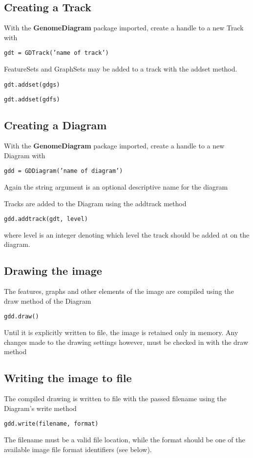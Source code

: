 \documentclass{article}
\begin{document}
\subsection{Creating a Track}
With the \textbf{GenomeDiagram} package imported, create a handle to a new
Track with

\texttt{gdt = GDTrack('name of track')}

FeatureSets and GraphSets may be added to a track with the add\us set method.

\texttt{gdt.add\us set(gdgs)}

\texttt{gdt.add\us set(gdfs)}


\subsection{Creating a Diagram}
With the \textbf{GenomeDiagram} package imported, create a handle to a new 
Diagram with 

\texttt{gdd = GDDiagram('name of diagram')}

Again the string argument is an optional descriptive name for the diagram

Tracks are added to the Diagram using the add\us track method

\texttt{gdd.add\us track(gdt, level)}

where level is an integer denoting which level the track should be added at 
on the diagram.


\subsection{Drawing the image}
The features, graphs and other elements of the image are compiled using the
draw method of the Diagram

\texttt{gdd.draw()}

Until it is explicitly written to file, the image is retained only in 
memory.  Any changes made to the drawing settings however, must be checked in 
with the draw method


\subsection{Writing the image to file}
The compiled drawing is written to file with the passed filename using 
the Diagram's write method

\texttt{gdd.write(filename, format)}

The filename must be a valid file location, while the format should be one of 
the available image file format identifiers (see below). 
\end{document}

